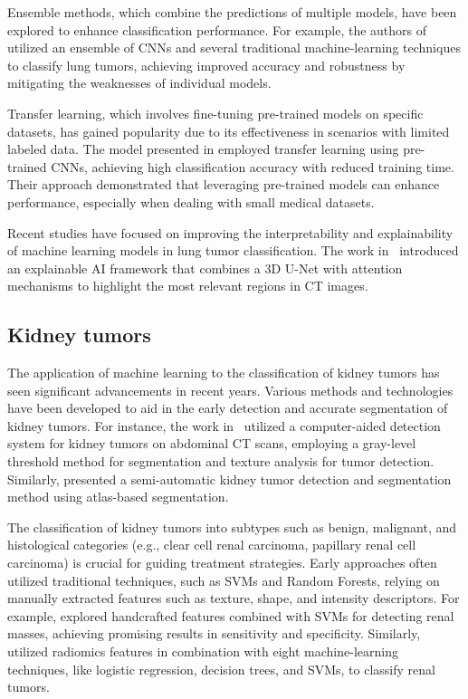 Ensemble methods, which combine the predictions of multiple models, have been explored to enhance classification performance. For example, the authors of \cite{zhang2019ensemble} utilized an ensemble of CNNs and several traditional machine-learning techniques to classify lung tumors, achieving improved accuracy and robustness by mitigating the weaknesses of individual models.

Transfer learning, which involves fine-tuning pre-trained models on specific datasets, has gained popularity due to its effectiveness in scenarios with limited labeled data. The model presented in \cite{8624570} employed transfer learning using pre-trained CNNs, achieving high classification accuracy with reduced training time. Their approach demonstrated that leveraging pre-trained models can enhance performance, especially when dealing with small medical datasets.

Recent studies have focused on improving the interpretability and explainability of machine learning models in lung tumor classification. The work in~\cite{WANG2024105646} introduced an explainable AI framework that combines a 3D U-Net with attention mechanisms to highlight the most relevant regions in CT images.


\subsection{Kidney tumors}

The application of machine learning to the classification of kidney tumors has seen significant advancements in recent years. Various methods and technologies have been developed to aid in the early detection and accurate segmentation of kidney tumors. For instance, the work in~\cite{kim04} utilized a computer-aided detection system for kidney tumors on abdominal CT scans, employing a gray-level threshold method for segmentation and texture analysis for tumor detection. Similarly, \cite{zhou2016atlas} presented a semi-automatic kidney tumor detection and segmentation method using atlas-based segmentation.

The classification of kidney tumors into subtypes such as benign, malignant, and histological categories (e.g., clear cell renal carcinoma, papillary renal cell carcinoma) is crucial for guiding treatment strategies. Early approaches often utilized traditional techniques, such as SVMs and Random Forests, relying on manually extracted features such as texture, shape, and intensity descriptors. For example, \cite{feng2018machine} explored handcrafted features combined with SVMs for detecting renal masses, achieving promising results in sensitivity and specificity. Similarly, \cite{erdim2020prediction} utilized radiomics features in combination with eight machine-learning techniques, like logistic regression, decision trees, and SVMs, to classify renal tumors.

